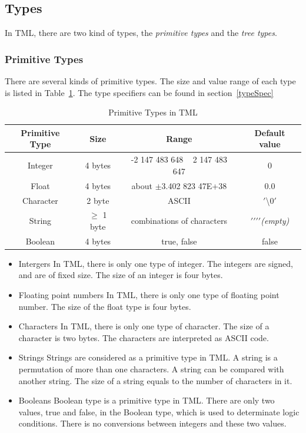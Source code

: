 \documentclass[12pt,psfig,a4]{article}
\begin{document}
\subsection {Types}
In TML, there are two kind of types, the \textit{primitive types} and the \textit{tree types}.

\subsubsection {Primitive Types}
There are several kinds of primitive types. The size and value range of each type is listed in Table~\ref{pri_types}. The type specifiers can be found in section~\ref{typeSpec}

\begin{table}[!ht]
\begin{center}
\begin{tabular}{| c | c | c | c |}
\hline
\textbf{Primitive Type} & \textbf{Size} & \textbf{Range} & \textbf{Default value} \\
\hline
Integer & 4 bytes & -2 147 483 648 ~  2 147 483 647 & 0 \\
\hline
Float & 4 bytes & about $\pm$3.402 823 47E+38 & 0.0\\
\hline
Character & 2 byte &  ASCII & $'$\textbackslash$0'$\\  %
\hline
String & $\geq$ 1 byte & combinations of characters & $'$$'$$'$$'$\textit{(empty)} \\
\hline
Boolean & 4 bytes & true, false & false \\
\hline
\end{tabular}
\caption{Primitive Types in TML}
\label{pri_types}
\end {center}
\end{table}


\begin{itemize}
\item Intergers
In TML, there is only one type of integer. The integers are signed, and are of fixed size. The size of an integer is four bytes.

\item Floating point numbers
In TML, there is only one type of floating point number. The size of the float type is four bytes.

\item Characters
In TML, there is only one type of character. The size of a character is two bytes. The characters are interpreted as ASCII code.

\item Strings
Strings are considered as a primitive type in TML. A string is a permutation of more than one characters. A string can be compared with another string. The size of a string equals to the number of characters in it.

\item Booleans
Boolean type is a primitive type in TML. There are only two values, true and false, in the Boolean type, which is used to determinate logic conditions. There is no conversions between integers and these two values.

\end{itemize}
\end{document}
